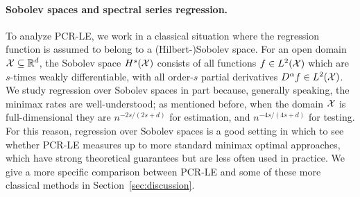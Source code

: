 
\paragraph{Sobolev spaces and spectral series regression.}
To analyze PCR-LE, we work in a classical situation where the regression function is assumed to belong to a (Hilbert-)Sobolev space. For an open domain $\mathcal{X} \subseteq \mathbb{R}^d$, the Sobolev space $H^s(\mathcal{X})$ consists of all functions $f \in L^2(\mathcal{X})$ which are $s$-times weakly differentiable, with all order-$s$ partial derivatives $D^{\alpha}f \in L^2(\mathcal{X})$. We study regression over Sobolev spaces in part because, generally speaking, the minimax rates are well-understood; as mentioned before, when the domain $\mathcal{X}$ is full-dimensional they are $n^{-2s/(2s + d)}$ for estimation, and $n^{-4s/(4s + d)}$ for testing. For this reason, regression over Sobolev spaces is a good setting in which to see whether PCR-LE measures up to more standard minimax optimal approaches, which have strong theoretical guarantees but are less often used in practice. We give a more specific comparison between PCR-LE and some of these more classical methods in Section~\ref{sec:discussion}.

